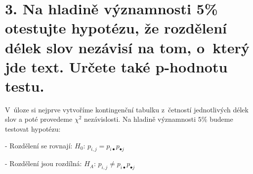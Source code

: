 \documentclass[11pt]{article}
\begin{document}
\section*{3. Na hladině významnosti 5\% otestujte hypotézu, že
rozdělení délek slov nezávisí na tom, o~který jde text. Určete také
p-hodnotu
testu.}\label{na-hladinux11b-vuxfdznamnosti-5-otestujte-hypotuxe9zu-ux17ee-rozdux11blenuxed-duxe9lek-slov-nezuxe1visuxed-na-tom-o-kteruxfd-jde-text.-urux10dete-takuxe9-p-hodnotu-testu.}

V~úloze si nejprve vytvoříme kontingenční tabulku z~četností
jednotlivých délek slov a poté provedeme \(\chi^{2}\) nezávislosti. Na
hladině významnosti \(5\%\) budeme testovat hypotézu: 

- Rozdělení se rovnají: \(H_0\): \(p_{i,j} = p_{i\bullet}p_{\bullet j}\)

- Rozdělení jsou rozdílná: \(H_A\): \(p_{i,j} \neq p_{i\bullet}p_{\bullet j}\)
\end{document}
